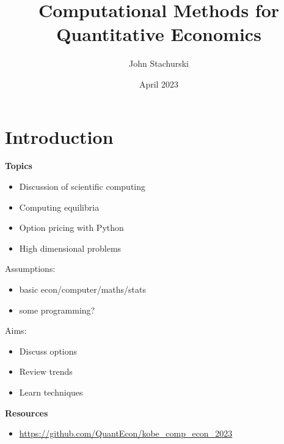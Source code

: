 \documentclass[
    xcolor={svgnames,dvipsnames},
    hyperref={colorlinks, citecolor=DeepPink4, linkcolor=DarkRed, urlcolor=DarkBlue}
    ]{beamer}  %
\title{Computational Methods for Quantitative Economics}
\author{John Stachurski}
\date{April 2023}
\newcommand{\1}{\mathbbm 1}
\begin{document}
\begin{frame}
  \titlepage
\end{frame}





\section{Introduction}



\begin{frame}


    \textbf{Topics}

    \begin{itemize}
        \item Discussion of scientific computing
        \vspace{0.5em}
        \item Computing equilibria
        \vspace{0.5em}
        \item Option pricing with Python
        \vspace{0.5em}
        \item High dimensional problems
    \end{itemize}

\end{frame}



\begin{frame}


    Assumptions:

    \begin{itemize}
        \item basic econ/computer/maths/stats 
        \vspace{0.3em}
        \item some programming?
    \end{itemize}

    \vspace{0.3em}
    \vspace{0.5em}
    Aims:

    \begin{itemize}
        \item Discuss options
        \vspace{0.5em}
        \item Review trends
        \vspace{0.5em}
        \item Learn techniques
    \end{itemize}

    \vspace{0.5em}
    \vspace{0.5em}
    \textbf{Resources}

    \begin{itemize}
        \item \url{https://github.com/QuantEcon/kobe_comp_econ_2023}
    \end{itemize}


\end{frame}
\end{document}
